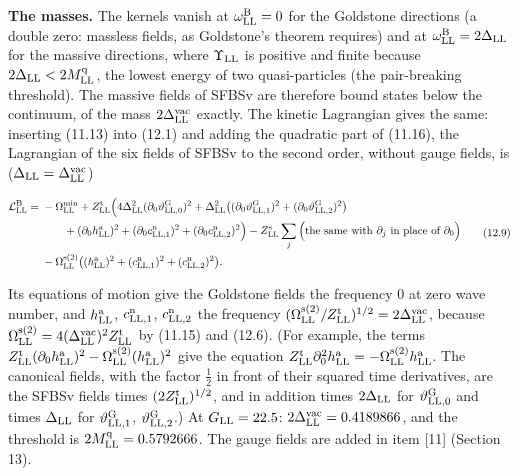 \documentclass[
  10pt,
]{article}
\begin{document}
\textbf{The masses.} The kernels vanish at \(\omega^{\rm B}_{\rm LL}=0\)
for the Goldstone directions (a double zero: massless fields, as
Goldstone's theorem requires) and at
\(\omega^{\rm B}_{\rm LL}=2\Delta_{\rm LL}\) for the massive directions,
where \(\Upsilon_{\rm LL}\) is positive and finite because
\(2\Delta_{\rm LL}<2M^{\rm q}_{\rm LL}\), the lowest energy of two
quasi-particles (the pair-breaking threshold). The massive fields of
SFBSv are therefore bound states below the continuum, of the mass
\(2\Delta^{\rm vac}_{\rm LL}\) exactly. The kinetic Lagrangian gives the
same: inserting (11.13) into (12.1) and adding the quadratic part of
(11.16), the Lagrangian of the six fields of SFBSv to the second order,
without gauge fields, is (\(\Delta_{\rm LL}=\Delta^{\rm vac}_{\rm LL}\))

\[\begin{aligned}\mathcal L^{\rm B}_{\rm LL}={}&-\Omega^{\rm min}_{\rm LL}+Z^{\rm t}_{\rm LL}\Big(4\Delta_{\rm LL}^2(\partial_0\vartheta^{\rm G}_{{\rm LL},0})^2+\Delta_{\rm LL}^2\big((\partial_0\vartheta^{\rm G}_{{\rm LL},1})^2+(\partial_0\vartheta^{\rm G}_{{\rm LL},2})^2\big)\\&\qquad+(\partial_0h^{\rm a}_{\rm LL})^2+(\partial_0c^{\rm n}_{{\rm LL},1})^2+(\partial_0c^{\rm n}_{{\rm LL},2})^2\Big)-Z^{\rm s}_{\rm LL}\sum_j\Big(\text{the same with }\partial_j\text{ in place of }\partial_0\Big)\\&-\Omega^{\rm s(2)}_{\rm LL}\big((h^{\rm a}_{\rm LL})^2+(c^{\rm n}_{{\rm LL},1})^2+(c^{\rm n}_{{\rm LL},2})^2\big).\end{aligned}\tag{12.9}\]

Its equations of motion give the Goldstone fields the frequency 0 at
zero wave number, and \(h^{\rm a}_{\rm LL}\),
\(c^{\rm n}_{{\rm LL},1}\), \(c^{\rm n}_{{\rm LL},2}\) the frequency
\((\Omega^{\rm s(2)}_{\rm LL}/Z^{\rm t}_{\rm LL})^{1/2}=2\Delta^{\rm vac}_{\rm LL}\),
because
\(\Omega^{\rm s(2)}_{\rm LL}=4(\Delta^{\rm vac}_{\rm LL})^2Z^{\rm t}_{\rm LL}\)
by (11.15) and (12.6). (For example, the terms
\(Z^{\rm t}_{\rm LL}(\partial_0h^{\rm a}_{\rm LL})^2-\Omega^{\rm s(2)}_{\rm LL}(h^{\rm a}_{\rm LL})^2\)
give the equation
\(Z^{\rm t}_{\rm LL}\partial_0^2h^{\rm a}_{\rm LL}=-\Omega^{\rm s(2)}_{\rm LL}h^{\rm a}_{\rm LL}\).
The canonical fields, with the factor \(\tfrac12\) in front of their
squared time derivatives, are the SFBSv fields times
\((2Z^{\rm t}_{\rm LL})^{1/2}\), and in addition times
\(2\Delta_{\rm LL}\) for \(\vartheta^{\rm G}_{{\rm LL},0}\) and times
\(\Delta_{\rm LL}\) for \(\vartheta^{\rm G}_{{\rm LL},1}\),
\(\vartheta^{\rm G}_{{\rm LL},2}\).) At \(G_{\rm LL}=22.5\):
\(2\Delta^{\rm vac}_{\rm LL}=0.4189866\), and the threshold is
\(2M^{\rm q}_{\rm LL}=0.5792666\). The gauge fields are added in item
{[}11{]} (Section 13).
\end{document}
